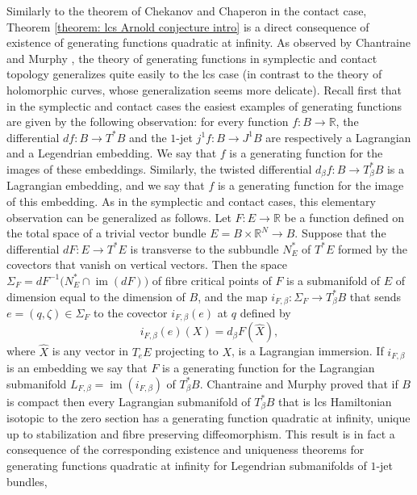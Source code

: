 \documentclass{amsart}
\DeclareMathOperator{\im}{im}
\theoremstyle{remark}
\begin{document}
Similarly to the theorem of Chekanov \cite{Chekanov} and Chaperon \cite{Chaperon}
in the contact case,
Theorem \ref{theorem: lcs Arnold conjecture intro}
is a direct consequence
of existence of generating functions quadratic at infinity.
As observed by Chantraine and Murphy \cite{CM},
the theory of generating functions in symplectic and contact topology
generalizes quite easily to the lcs case
(in contrast to the theory of holomorphic curves,
whose generalization seems more delicate).
Recall first that in the symplectic and contact cases
the easiest examples of generating functions
are given by the following observation:
for every function $f: B \rightarrow \mathbb{R}$,
the differential $df: B \rightarrow T^{\ast}B$
and the $1$-jet $j^1f: B \rightarrow J^1B$
are respectively a Lagrangian and a Legendrian embedding.
We say that $f$ is a generating function for the images of these embeddings.
Similarly,
the twisted differential $d_{\beta}f: B \rightarrow T_{\beta}^{\ast}B$
is a Lagrangian embedding,
and we say that $f$ is a generating function
for the image of this embedding.
As in the symplectic and contact cases,
this elementary observation
can be generalized as follows.
Let $F: E \rightarrow \mathbb{R}$ be a function
defined on the total space
of a trivial vector bundle $E = B \times \mathbb{R}^N \rightarrow B$.
Suppose that the differential $dF: E \rightarrow T^{\ast}E$
is transverse to the subbundle $N_E^{\ast}$ of $T^{\ast}E$
formed by the covectors that vanish on vertical vectors.
Then the space
$\Sigma_F = dF^{-1} \big(N_E^{\ast} \cap \im (dF)\big)$
of fibre critical points of $F$
is a submanifold of $E$ of dimension equal to the dimension of $B$,
and the map $i_{F, \beta}: \Sigma_F \rightarrow T^{\ast}_{\beta}B$
that sends $e = (q, \zeta) \in \Sigma_F$
to the covector $i_{F, \beta}(e)$ at $q$
defined by $$i_{F, \beta} (e) (X) = d_{\beta}F (\hat{X}),$$
where $\hat{X}$ is any vector in $T_eE$ projecting to $X$,
is a Lagrangian immersion.
If $i_{F, \beta}$ is an embedding
we say that $F$ is a generating function
for the Lagrangian submanifold
$L_{F, \beta} = \im (i_{F, \beta})$ of $T_{\beta}^{\ast}B$.
Chantraine and Murphy \cite{CM} proved that
if $B$ is compact then every Lagrangian submanifold of $T_{\beta}^{\ast}B$
that is lcs Hamiltonian isotopic to the zero section
has a generating function quadratic at infinity,
unique up to stabilization and fibre preserving diffeomorphism.
This result is in fact a consequence of the corresponding existence and uniqueness theorems
for generating functions quadratic at infinity for Legendrian submanifolds of $1$-jet bundles,
\end{document}
